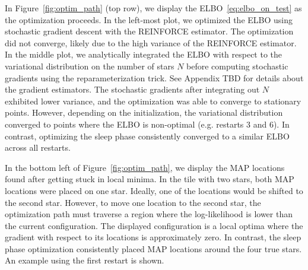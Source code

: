 In Figure~\ref{fig:optim_path} (top row), we display the ELBO~\eqref{eq:elbo_on_test} as the optimization proceeds.
In the left-most plot, we optimized the ELBO using stochastic gradient descent with the REINFORCE estimator.
The optimization did not converge, likely due to the high variance of the REINFORCE estimator. 
In the middle plot, we analytically integrated the ELBO with respect to the variational distribution on the number of stars $N$ before computing stochastic gradients using the reparameterization trick.
See Appendix TBD for details about the gradient estimators. 
The stochastic gradients after integrating out $N$ exhibited lower variance, and the optimization was able to converge to stationary points. 
However, depending on the initialization, the variational distribution converged to points where the ELBO is non-optimal (e.g. restarts 3 and 6). 
In contrast, optimizing the sleep phase consistently converged to a similar ELBO across all restarts. 

In the bottom left of Figure~\ref{fig:optim_path}, we display the MAP locations found after getting stuck in local minima. In the tile with two stars, both MAP locations were placed on one star. Ideally, one of the locations would be shifted to the second star. However, to move one location to the second star, the optimization path must traverse a region where the log-likelihood is lower than the current configuration. The displayed configuration is a local optima where the gradient with respect to its locations is approximately zero. In contrast, the sleep phase optimization consistently placed MAP locations around the four true stars. An example using the first restart is shown. 


